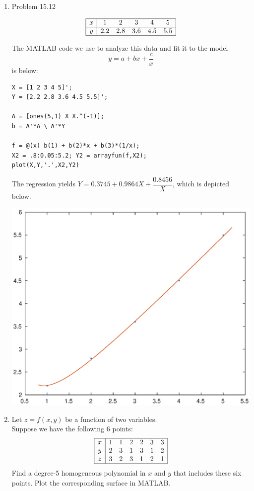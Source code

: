 \documentclass[12pt]{amsart}
\begin{document}
\begin{enumerate}
\vfill
\pagebreak

\item Problem 15.12


\vspace{5mm}

\[
\begin{array}{|c|ccccc|} \hline
x & 1 & 2 & 3 & 4 & 5 \\ \hline
y & 2.2 & 2.8 & 3.6 & 4.5 & 5.5 \\ \hline
\end{array}
\]

The MATLAB code we use to analyze this data and
fit it to the model
\[ y = a + bx + \dfrac{c}{x}\]
is below:

\begin{verbatim}
X = [1 2 3 4 5]';
Y = [2.2 2.8 3.6 4.5 5.5]';

A = [ones(5,1) X X.^(-1)];
b = A'*A \ A'*Y

f = @(x) b(1) + b(2)*x + b(3)*(1/x);
X2 = .8:0.05:5.2; Y2 = arrayfun(f,X2);
plot(X,Y,'.',X2,Y2)
\end{verbatim}

The regression yields $Y = 0.3745 + 0.9864 X + \dfrac{ 0.8456}{X}$, which 
is depicted below.

\includegraphics[width=.8\textwidth]{p3fit.eps}
\vfill
\pagebreak

\item Let $z = f(x,y)$ be a function of two variables. \\
 Suppose
we have the following $6$ points:
\[
\begin{array}{|c|cccccc|} \hline
x & 1 & 1 & 2 & 2 & 3 & 3 \\
y & 2 & 3 & 1 & 3 & 1 & 2 \\
z & 3 & 2 & 3 & 1 & 2 & 1 \\ \hline
\end{array}
\]
Find a degree-5 homogeneous polynomial in $x$ and $y$
that includes these six points. Plot the corresponding
surface in MATLAB.


\end{enumerate}
\end{document}

